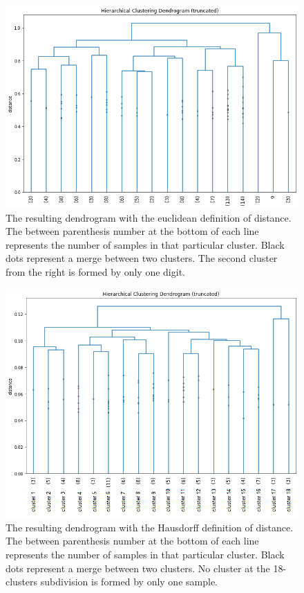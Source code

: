\documentclass[a4paper]{report}
\begin{document}
\begin{figure} [H]
	\centering
	\includegraphics [width=\textwidth]{d/euclidean.png}
	\caption{The resulting dendrogram with the euclidean definition of distance. The between parenthesis number at the bottom of each line represents the number of samples in that particular cluster. Black dots represent a merge between two clusters. The second cluster from the right is formed by only one digit.}
	\label{clusteringeuclidean}
\end{figure}

\begin{figure} [H]
	\centering
	\includegraphics [width=\textwidth]{o/clustering.png}
	\caption{The resulting dendrogram with the Hausdorff definition of distance. The between parenthesis number at the bottom of each line represents the number of samples in that particular cluster. Black dots represent a merge between two clusters. No cluster at the 18-clusters subdivision is formed by only one sample.}
	\label{clustering}
\end{figure}
\end{document}

